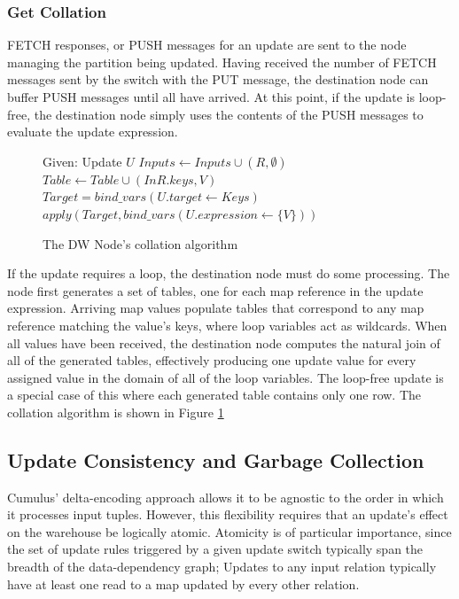 \subsubsection{Get Collation}

FETCH responses, or PUSH messages for an update are sent to the node managing the partition being updated.  Having received the number of FETCH messages sent by the switch with the PUT message, the destination node can buffer PUSH messages until all have arrived.  At this point, if the update is loop-free, the destination node simply uses the contents of the PUSH messages to evaluate the update expression.

\begin{figure}
\begin{algorithmic}[1]
\STATE Given: Update $U$
	\STATE $Inputs \leftarrow Inputs \cup (R, \emptyset)$
\ENDFOR
{}
			\STATE $Table \leftarrow Table \cup (InR.keys, V)$
		\ENDIF
	\ENDFOR
\ENDFOR
{}
	\STATE $Target = bind\_vars(U.target \leftarrow Keys)$
	\STATE $apply(Target, bind\_vars(U.expression \leftarrow \{V\}))$
\ENDFOR
\end{algorithmic}
\caption{The DW Node's collation algorithm}
\label{alg:collation}
\end{figure}

If the update requires a loop, the destination node must do some processing.  The node first generates a set of tables, one for each map reference in the update expression.  Arriving map values populate tables that correspond to any map reference matching the value's keys, where loop variables act as wildcards.  When all values have been received, the destination node computes the natural join of all of the generated tables, effectively producing one update value for every assigned value in the domain of all of the loop variables.  The loop-free update is a special case of this where each generated table contains only one row.  The collation algorithm is shown in Figure \ref{alg:collation}

\subsection{Update Consistency and Garbage Collection}

Cumulus' delta-encoding approach allows it to be agnostic to the order in which it processes input tuples.  However, this flexibility requires that an update's effect on the warehouse be logically atomic.  Atomicity is of particular importance, since the set of update rules triggered by a given update switch typically span the breadth of the data-dependency graph; Updates to any input relation typically have at least one read to a map updated by every other relation.

